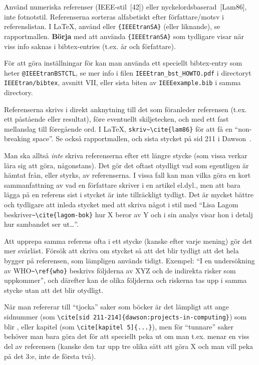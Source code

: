 Använd numeriska referenser (IEEE-stil~[42]) eller nyckelordsbaserad~[Lam86], inte fotnotstil. Referenserna sorteras alfabetiskt efter författare/motsv i referenslistan. I LaTeX, använd \verb|| eller \verb|{IEEEtranSA}| (eller liknande), se rapportmallen. \textbf{Börja} med att använda \verb|{IEEEtranSA}| som tydligare visar när viss info saknas i bibtex-entries (t.ex. år och författare).

För att göra inställningar för \verb|| kan man använda ett speciellt bibtex-entry som heter \texttt{@IEEEtranBSTCTL}, se mer info i filen \texttt{IEEEtran\_bst\_HOWTO.pdf} i directoryt \texttt{IEEEtran/bibtex}, avsnitt VII, eller sista biten av \texttt{IEEEexample.bib} i samma directory.

Referenserna skrivs i direkt anknytning till det som föranleder referensen (t.ex. ett påstående eller resultat), före eventuellt skiljetecken, och med ett fast mellanslag till föregående ord. I La\TeX, \verb|skriv~\cite{lam86}| för att få en ``non-breaking space''. Se också rapportmallen, och sista stycket på sid 211 i Dawson~\cite{dawson:projects-in-computing}. 

Man ska alltså \emph{inte} skriva referenserna efter ett längre stycke (som vissa verkar lära sig att göra, någonstans). Det gör det oftast otydligt vad som egentligen är hämtat från, eller styrks, av referenserna. I vissa fall kan man vilka göra en kort sammanfattning av vad en författare skriver i en artikel el.dyl., men att bara lägga på en referens sist i stycket är inte tillräckligt tydligt. Det är mycket bättre och tydligare att inleda stycket med att skriva något i stil med ``Lisa Lagom beskriver\verb|~\cite{lagom-bok}| hur X beror av Y och i sin analys visar hon i detalj hur sambandet ser ut\ldots''.

Att upprepa samma referens ofta i ett stycke (kanske efter varje mening) gör det mer svårläst. Försök att skriva om stycket så att det blir tydligt att det hela bygger på referensen, som lämpligen används tidigt. Exempel: ``I en undersökning av WHO\verb|~\ref{who}| beskrivs följderna av XYZ och de indirekta risker som uppkommer'', och därefter kan de olika följderna och riskerna tas upp i samma stycke utan att det blir otydligt.

När man refererar till ``tjocka'' saker som böcker är det lämpligt att ange sidnummer 
(som \verb|\cite[sid 211-214]{dawson:projects-in-computing}|) som blir \cite[sid 211-214]{dawson:projects-in-computing}, eller kapitel (som \verb|\cite[kapitel 5]{...}|), men för ``tunnare'' saker behöver man bara göra det för att speciellt peka ut om man t.ex. menar en viss del av referensen (kanske den tar upp tre olika sätt att göra X och man vill peka på det 3:e, inte de första två).

